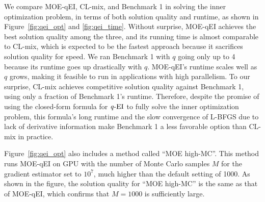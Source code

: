 \documentclass[paper=letter]{scrartcl}
\newcommand{\qEI}{\text{\textit q-EI}}
\begin{document}
We compare MOE-qEI, CL-mix, and Benchmark 1 in solving the inner optimization problem, in terms of both solution quality and runtime, as shown in Figure~\ref{fig:qei_opt} and \ref{fig:qei_time}. Without surprise, MOE-qEI achieves the best solution quality among the three, and its running time is almost comparable to CL-mix, which is expected to be the fastest approach because it sacrifices solution quality for speed.  We ran Benchmark 1 with $q$ going only up to 4 because its runtime goes up drastically with $q$.
MOE-qEI's runtime scales well as $q$ grows, making it feasible to run in applications with high parallelism. To our surprise, CL-mix achieves competitive solution quality against Benchmark 1, using only a fraction of Benchmark 1's runtime. Therefore, despite the promise of using the closed-form formula for $\qEI$ to fully solve the inner optimization problem, this formula's long runtime and the slow convergence of L-BFGS due to lack of derivative information make Benchmark 1 a less favorable option than CL-mix in practice. 

Figure~\ref{fig:qei_opt} also includes a method called \enquote{MOE high-MC}. This method runs MOE-qEI on GPU with the number of Monte Carlo samples $M$ for the gradient estimator set to $10^7$, much higher than the default setting of 1000. As shown in the figure, the solution quality for \enquote{MOE high-MC} is the same as that of MOE-qEI, which confirms that $M=1000$ is sufficiently large.



\end{document}
